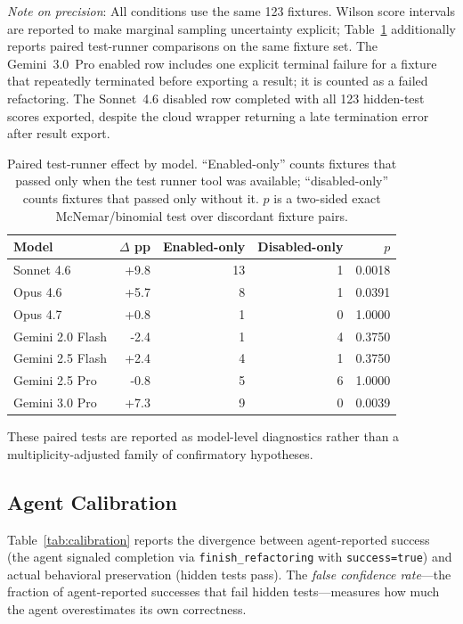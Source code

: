 \documentclass[11pt,letterpaper]{article}
\begin{document}
\noindent\emph{Note on precision}: All conditions use the same 123 fixtures. Wilson score intervals are reported to make marginal sampling uncertainty explicit; Table~\ref{tab:paired-tool-effect} additionally reports paired test-runner comparisons on the same fixture set. The Gemini~3.0~Pro enabled row includes one explicit terminal failure for a fixture that repeatedly terminated before exporting a result; it is counted as a failed refactoring. The Sonnet~4.6 disabled row completed with all 123 hidden-test scores exported, despite the cloud wrapper returning a late termination error after result export.

\begin{table}[ht]
\centering
\caption{Paired test-runner effect by model. ``Enabled-only'' counts fixtures that passed only when the test runner tool was available; ``disabled-only'' counts fixtures that passed only without it. $p$ is a two-sided exact McNemar/binomial test over discordant fixture pairs.}
\label{tab:paired-tool-effect}
\small
\begin{tabular}{lrrrr}
\toprule
\textbf{Model} & \textbf{$\Delta$ pp} & \textbf{Enabled-only} & \textbf{Disabled-only} & \textbf{$p$} \\
\midrule
Sonnet 4.6 & +9.8 & 13 & 1 & 0.0018 \\
Opus 4.6 & +5.7 & 8 & 1 & 0.0391 \\
Opus 4.7 & +0.8 & 1 & 0 & 1.0000 \\
Gemini 2.0 Flash & -2.4 & 1 & 4 & 0.3750 \\
Gemini 2.5 Flash & +2.4 & 4 & 1 & 0.3750 \\
Gemini 2.5 Pro & -0.8 & 5 & 6 & 1.0000 \\
Gemini 3.0 Pro & +7.3 & 9 & 0 & 0.0039 \\
\bottomrule
\end{tabular}
\end{table}

\noindent These paired tests are reported as model-level diagnostics rather than a multiplicity-adjusted family of confirmatory hypotheses.

\subsection{Agent Calibration}

Table~\ref{tab:calibration} reports the divergence between agent-reported success (the agent signaled completion via \texttt{finish\_refactoring} with \texttt{success=true}) and actual behavioral preservation (hidden tests pass). The \emph{false confidence rate}---the fraction of agent-reported successes that fail hidden tests---measures how much the agent overestimates its own correctness.
\end{document}
